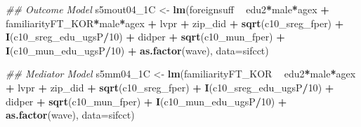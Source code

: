 \documentclass[
]{article}
\newenvironment{Shaded}{\begin{snugshade}}{\end{snugshade}}
\newcommand{\CommentTok}[1]{\textcolor[rgb]{0.56,0.35,0.01}{\textit{#1}}}
\newcommand{\DataTypeTok}[1]{\textcolor[rgb]{0.13,0.29,0.53}{#1}}
\newcommand{\DecValTok}[1]{\textcolor[rgb]{0.00,0.00,0.81}{#1}}
\newcommand{\KeywordTok}[1]{\textcolor[rgb]{0.13,0.29,0.53}{\textbf{#1}}}
\newcommand{\NormalTok}[1]{#1}
\newcommand{\OperatorTok}[1]{\textcolor[rgb]{0.81,0.36,0.00}{\textbf{#1}}}
\newcommand{\StringTok}[1]{\textcolor[rgb]{0.31,0.60,0.02}{#1}}
\begin{document}
\begin{Shaded}
\begin{Highlighting}[]
\CommentTok{## Outcome Model }
\NormalTok{s5mout04_1C <-}\StringTok{ }\KeywordTok{lm}\NormalTok{(foreignsuff  }\OperatorTok{~}\StringTok{ }\NormalTok{edu2}\OperatorTok{*}\NormalTok{male}\OperatorTok{*}\NormalTok{agex }\OperatorTok{+}\StringTok{ }\NormalTok{familiarityFT_KOR}\OperatorTok{*}\NormalTok{male}\OperatorTok{*}\NormalTok{agex }\OperatorTok{+}\StringTok{ }\NormalTok{lvpr }\OperatorTok{+}\StringTok{  }
\StringTok{                    }\NormalTok{zip_did }\OperatorTok{+}\StringTok{ }\KeywordTok{sqrt}\NormalTok{(c10_sreg_fper) }\OperatorTok{+}\StringTok{ }\KeywordTok{I}\NormalTok{(c10_sreg_edu_ugsP}\OperatorTok{/}\DecValTok{10}\NormalTok{) }\OperatorTok{+}\StringTok{ }
\StringTok{                    }\NormalTok{didper }\OperatorTok{+}\StringTok{ }\KeywordTok{sqrt}\NormalTok{(c10_mun_fper) }\OperatorTok{+}\StringTok{ }\KeywordTok{I}\NormalTok{(c10_mun_edu_ugsP}\OperatorTok{/}\DecValTok{10}\NormalTok{) }\OperatorTok{+}\StringTok{ }
\StringTok{                    }\KeywordTok{as.factor}\NormalTok{(wave), }\DataTypeTok{data=}\NormalTok{sifcct)}

\CommentTok{## Mediator Model}
\NormalTok{s5mm04_1C <-}\StringTok{ }\KeywordTok{lm}\NormalTok{(familiarityFT_KOR  }\OperatorTok{~}\StringTok{ }\NormalTok{edu2}\OperatorTok{*}\NormalTok{male}\OperatorTok{*}\NormalTok{agex }\OperatorTok{+}\StringTok{ }\NormalTok{lvpr }\OperatorTok{+}\StringTok{  }
\StringTok{                  }\NormalTok{zip_did }\OperatorTok{+}\StringTok{ }\KeywordTok{sqrt}\NormalTok{(c10_sreg_fper) }\OperatorTok{+}\StringTok{ }\KeywordTok{I}\NormalTok{(c10_sreg_edu_ugsP}\OperatorTok{/}\DecValTok{10}\NormalTok{) }\OperatorTok{+}\StringTok{ }
\StringTok{                  }\NormalTok{didper }\OperatorTok{+}\StringTok{ }\KeywordTok{sqrt}\NormalTok{(c10_mun_fper) }\OperatorTok{+}\StringTok{ }\KeywordTok{I}\NormalTok{(c10_mun_edu_ugsP}\OperatorTok{/}\DecValTok{10}\NormalTok{) }\OperatorTok{+}\StringTok{ }
\StringTok{                  }\KeywordTok{as.factor}\NormalTok{(wave), }\DataTypeTok{data=}\NormalTok{sifcct)}


\end{Highlighting}
\end{Shaded}
\end{document}
